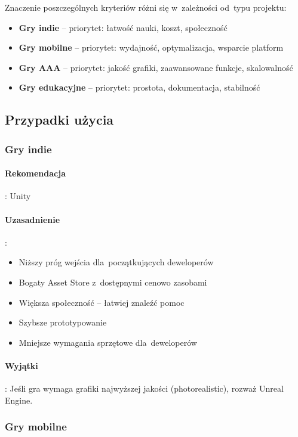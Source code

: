 Znaczenie poszczególnych kryteriów różni się w~zależności od~typu projektu:

\begin{itemize}
    \item \textbf{Gry indie} -- priorytet: łatwość nauki, koszt, społeczność
    \item \textbf{Gry mobilne} -- priorytet: wydajność, optymalizacja, wsparcie platform
    \item \textbf{Gry AAA} -- priorytet: jakość grafiki, zaawansowane funkcje, skalowalność
    \item \textbf{Gry edukacyjne} -- priorytet: prostota, dokumentacja, stabilność
\end{itemize}

\subsection{Przypadki użycia}

\subsubsection{Gry indie}

\paragraph{Rekomendacja}: Unity

\paragraph{Uzasadnienie}:
\begin{itemize}
    \item Niższy próg wejścia dla~początkujących deweloperów
    \item Bogaty Asset Store z~dostępnymi cenowo zasobami
    \item Większa społeczność -- łatwiej znaleźć pomoc
    \item Szybsze prototypowanie
    \item Mniejsze wymagania sprzętowe dla~deweloperów
\end{itemize}

\paragraph{Wyjątki}:
Jeśli gra wymaga grafiki najwyższej jakości (photorealistic), rozważ Unreal Engine.

\subsubsection{Gry mobilne}

